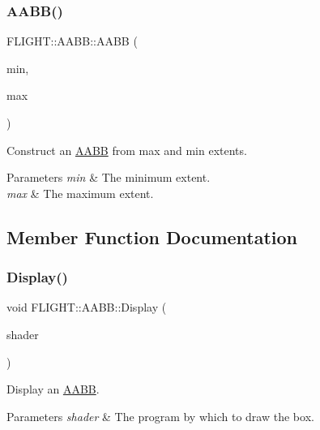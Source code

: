 \subsubsection{\texorpdfstring{A\+A\+B\+B()}{AABB()}}
{\footnotesize\ttfamily F\+L\+I\+G\+H\+T\+::\+A\+A\+B\+B\+::\+A\+A\+BB (\begin{DoxyParamCaption}\item[{const glm\+::vec3 \&}]{min,  }\item[{const glm\+::vec3 \&}]{max }\end{DoxyParamCaption})}



Construct an \hyperlink{class_f_l_i_g_h_t_1_1_a_a_b_b}{A\+A\+BB} from max and min extents. 


\begin{DoxyParams}{Parameters}
{\em min} & The minimum extent. \\
\hline
{\em max} & The maximum extent. \\
\hline
\end{DoxyParams}


\subsection{Member Function Documentation}
\mbox{\label{class_f_l_i_g_h_t_1_1_a_a_b_b_ac991288fd69365a3220374a1413c2b0c}} 
\subsubsection{\texorpdfstring{Display()}{Display()}}
{\footnotesize\ttfamily void F\+L\+I\+G\+H\+T\+::\+A\+A\+B\+B\+::\+Display (\begin{DoxyParamCaption}\item[{\hyperlink{class_f_l_i_g_h_t_1_1_shader_program}{Shader\+Program} \&}]{shader }\end{DoxyParamCaption})}



Display an \hyperlink{class_f_l_i_g_h_t_1_1_a_a_b_b}{A\+A\+BB}. 


\begin{DoxyParams}{Parameters}
{\em shader} & The program by which to draw the box. \\
\hline
\end{DoxyParams}
\mbox{\label{class_f_l_i_g_h_t_1_1_a_a_b_b_aa479f15e7e2edd4a32270c6ad2dbed0b}} 
